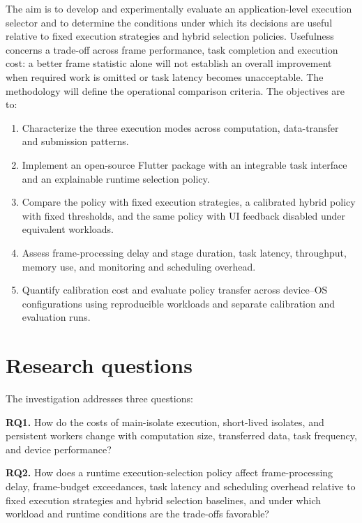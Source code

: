 \documentclass[14pt,a4paper,oneside]{extreport}
\providecommand{\tightlist}{%
  \setlength{\itemsep}{0pt}%
  \setlength{\parskip}{0pt}%
}
\begin{document}
The aim is to develop and experimentally evaluate an application-level execution selector and
to determine the conditions under which its decisions are useful relative to fixed execution
strategies and hybrid selection policies. Usefulness concerns a trade-off across frame
performance, task completion and
execution cost: a better frame statistic alone will not establish an overall improvement when
required work is omitted or task latency becomes unacceptable. The methodology will define the
operational comparison criteria. The objectives are to:

\begin{enumerate}
  \def\labelenumi{\arabic{enumi}.}
  \tightlist
  \item
    Characterize the three execution modes across computation, data-transfer and submission
  patterns.
  \item
    Implement an open-source Flutter package with an integrable task interface and an
  explainable runtime selection policy.
  \item
    Compare the policy with fixed execution strategies, a calibrated hybrid policy with fixed
  thresholds, and the same policy with UI feedback disabled under equivalent workloads.
  \item
    Assess frame-processing delay and stage duration, task latency, throughput, memory use, and
  monitoring and scheduling overhead.
  \item
    Quantify calibration cost and evaluate policy transfer across device--OS configurations
  using reproducible workloads and separate calibration and evaluation runs.
\end{enumerate}

\section{Research questions}
\label{research-questions}

The investigation addresses three questions:

\textbf{RQ1.} How do the costs of main-isolate execution, short-lived isolates, and persistent
workers change with computation size, transferred data, task frequency, and device
performance?

\textbf{RQ2.} How does a runtime execution-selection policy affect frame-processing delay,
frame-budget exceedances, task latency and scheduling overhead relative to fixed execution
strategies and hybrid selection baselines,
and under which workload and runtime conditions are the trade-offs favorable?
\end{document}
